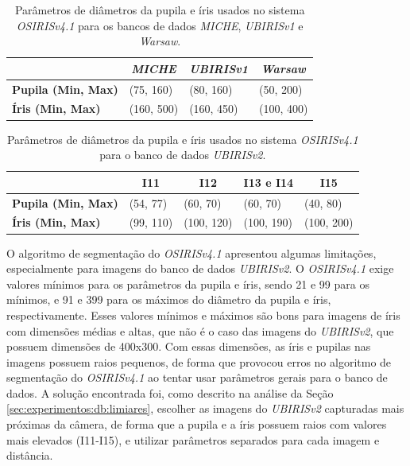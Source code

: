 \begin{table}[H]
\centering
\caption{Parâmetros de diâmetros da pupila e íris usados no sistema \textit{OSIRISv4.1} para os bancos de dados \textit{MICHE}, \textit{UBIRISv1} e \textit{Warsaw}.}
\label{tab:experimentos:diametros}
\begin{tabular}{l|l|l|l|}
\cline{2-4}
 & \multicolumn{1}{c|}{\textit{\textbf{MICHE}}} & \multicolumn{1}{c|}{\textit{\textbf{UBIRISv1}}} & \multicolumn{1}{c|}{\textit{\textbf{Warsaw}}} \\ \hline
\multicolumn{1}{|l|}{\textbf{Pupila (Min, Max)}} & (75, 160) & (80, 160) & (50, 200) \\ \hline
\multicolumn{1}{|l|}{\textbf{Íris (Min, Max)}} & (160, 500) & (160, 450) & (100, 400) \\ \hline
\end{tabular}
\end{table}

\begin{table}[H]
\centering
\caption{Parâmetros de diâmetros da pupila e íris usados no sistema \textit{OSIRISv4.1} para o banco de dados \textit{UBIRISv2}.}
\label{tab:experimentos:diametros_ubirisv2}
\begin{tabular}{l|l|l|l|l|}
\cline{2-5}
 & \multicolumn{1}{c|}{\textbf{I11}} & \multicolumn{1}{c|}{\textbf{I12}} & \multicolumn{1}{c|}{\textbf{I13 e I14}} & \multicolumn{1}{c|}{\textbf{I15}} \\ \hline
\multicolumn{1}{|l|}{\textbf{Pupila (Min, Max)}} & (54, 77) & (60, 70) & (60, 70) & (40, 80) \\ \hline
\multicolumn{1}{|l|}{\textbf{Íris (Min, Max)}} & (99, 110) & (100, 120) & (100, 190) & (100, 200) \\ \hline
\end{tabular}
\end{table}

\par O algoritmo de segmentação do \textit{OSIRISv4.1} apresentou algumas limitações, especialmente para imagens do banco de dados \textit{UBIRISv2}. O \textit{OSIRISv4.1} exige valores mínimos para os parâmetros da pupila e íris, sendo 21 e 99 para os mínimos, e 91 e 399 para os máximos do diâmetro da pupila e íris, respectivamente. Esses valores mínimos e máximos são bons para imagens de íris com dimensões médias e altas, que não é o caso das imagens do \textit{UBIRISv2}, que possuem dimensões de 400x300. Com essas dimensões, as íris e pupilas nas imagens possuem raios pequenos, de forma que provocou erros no algoritmo de segmentação do \textit{OSIRISv4.1} ao tentar usar parâmetros gerais para o banco de dados. A solução encontrada foi, como descrito na análise da Seção \ref{sec:experimentos:db:limiares}, escolher as imagens do \textit{UBIRISv2} capturadas mais próximas da câmera, de forma que a pupila e a íris possuem raios com valores mais elevados (I11-I15), e utilizar parâmetros separados para cada imagem e distância. 

